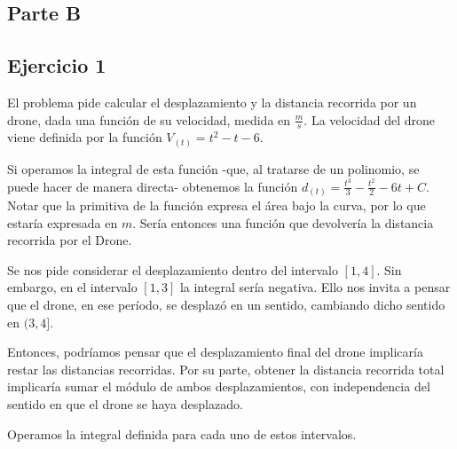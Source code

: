\subsection*{Parte B}

\subsection*{Ejercicio 1}

El problema pide calcular el desplazamiento y la distancia recorrida por un drone,
dada una función de su velocidad, medida en $\frac{m}{s}$. 
La velocidad del drone viene definida por la función $V_{(t)} = t^2 - t - 6$.

\begin{center}
\end{center}

Si operamos la integral de esta función -que, al tratarse de un polinomio, se puede hacer de manera directa- obtenemos la función $d_{(t)} = \frac{t^3}{3} - \frac{t^2}{2} - 6t + C$. Notar que la primitiva de la función expresa el área bajo la curva, por lo que estaría expresada en $m$. Sería entonces una función que devolvería la distancia recorrida por el Drone.

Se nos pide considerar el desplazamiento dentro del intervalo $[1, 4]$. 
Sin embargo, en el intervalo $[1, 3]$ la integral sería negativa. 
Ello nos invita a pensar que el drone, en ese período, se desplazó en un sentido, cambiando dicho sentido en $(3, 4]$.

Entonces, podríamos pensar que el desplazamiento final del drone implicaría restar las distancias recorridas. Por su parte, obtener la distancia recorrida total implicaría sumar el módulo de ambos desplazamientos, con independencia del sentido en que el drone se haya desplazado.

Operamos la integral definida para cada uno de estos intervalos.

